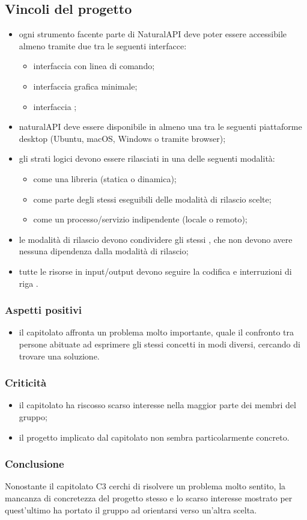   \subsection{Vincoli del progetto}
   	\begin{itemize}
   		\item ogni strumento facente parte di NaturalAPI deve poter essere accessibile almeno tramite due tra le seguenti interfacce:
   			\begin{itemize}
   				\item interfaccia con linea di comando;
   				\item interfaccia grafica minimale;
   				\item interfaccia ;
   			\end{itemize}
   			\item naturalAPI deve essere disponibile in almeno una tra le seguenti piattaforme desktop (Ubuntu, macOS, Windows o tramite browser);
   			\item gli strati logici devono essere rilasciati in una delle seguenti modalità:
   				\begin{itemize}
   					\item come una libreria (statica o dinamica);
   					\item come parte degli stessi eseguibili delle modalità di rilascio scelte;
   					\item come un processo/servizio indipendente (locale o remoto);
   				\end{itemize}
   			\item le modalità di rilascio devono condividere gli stessi , che non devono avere nessuna dipendenza dalla modalità di rilascio;
   			\item tutte le risorse in input/output devono seguire la codifica  e interruzioni di riga .
   	\end{itemize}

    \subsubsection{Aspetti positivi}
    \begin{itemize}
      \item il capitolato affronta un problema molto importante, quale il confronto tra persone abituate ad esprimere gli stessi concetti in modi diversi, cercando di trovare una soluzione.
    \end{itemize}
    \subsubsection{Criticità}
    \begin{itemize}
    		\item il capitolato ha riscosso scarso interesse nella maggior parte dei membri del gruppo;
    		\item il progetto implicato dal capitolato non sembra particolarmente concreto.
    \end{itemize}
    \subsubsection{Conclusione}
    Nonostante il capitolato C3 cerchi di risolvere un problema molto sentito, la mancanza di concretezza del progetto stesso e lo scarso interesse mostrato per quest'ultimo ha portato il gruppo ad orientarsi verso un'altra scelta.
